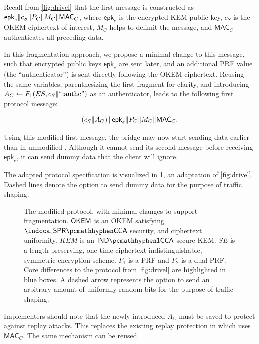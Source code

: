 Recall from \cref{fig:drivel} that the first \drivel{} message is constructed as $\mathsf{epk}_e \| c_S \| P_C \| M_C \| \mathsf{MAC}_C$, where $\mathsf{epk}_e$ is the encrypted KEM public key, $c_S$ is the OKEM ciphertext of interest, $M_C$ helps to delimit the message, and $\mathsf{MAC}_C$ authenticates all preceding data.

In this fragmentation approach, we propose a minimal change to this message, such that encrypted public keys $\mathsf{epk}_e$ are sent later, and an additional PRF value (the ``authenticator'') is sent directly following the OKEM ciphertext. Reusing the same variables, parenthesizing the first fragment for clarity, and introducing $A_C \gets F_1(ES, c_S \| \text{``:authc''})$ as an authenticator, leads to the following first protocol message:

\[
    \left( c_S \| A_C \right) \| \mathsf{epk}_e \| P_C \| M_C \| \mathsf{MAC}_C .
\]

Using this modified first message, the bridge may now start sending data earlier than in unmodified \drivel{}. Although it cannot send its second message before receiving $\mathsf{epk}_e$, it can send dummy data that the client will ignore.

The adapted protocol specification is visualized in \cref{fig:modified-drivel-minimal}, an adaptation of \cref{fig:drivel}. Dashed lines denote the option to send dummy data for the purpose of traffic shaping.

\begin{figure}
    
    \caption[
        The modified \drivel{} protocol, with minimal changes to support fragmentation.
    ]{
        The modified \drivel{} protocol, with minimal changes to support fragmentation.
        $\mathsf{OKEM}$ is an OKEM satisfying $\indcca, \sprcca$ security, and ciphertext uniformity.
        $KEM$ is an $\indonecca$-secure KEM.
        $SE$ is a length-preserving, one-time ciphertext indistinguishable, symmetric encryption scheme.
        $F_1$ is a PRF and $F_2$ is a dual PRF.
        Core differences to the \drivel{} protocol from \cref{fig:drivel} are highlighted in blue boxes.
        A dashed arrow represents the option to send an arbitrary amount of uniformly random bits for the purpose of traffic shaping.
    }
    \label{fig:modified-drivel-minimal}
\end{figure}

Implementers should note that the newly introduced $A_C$ must be saved to protect against replay attacks. This replaces the existing replay protection in \obfsfour{} which uses $\mathsf{MAC}_C$. The same mechanism can be reused.

